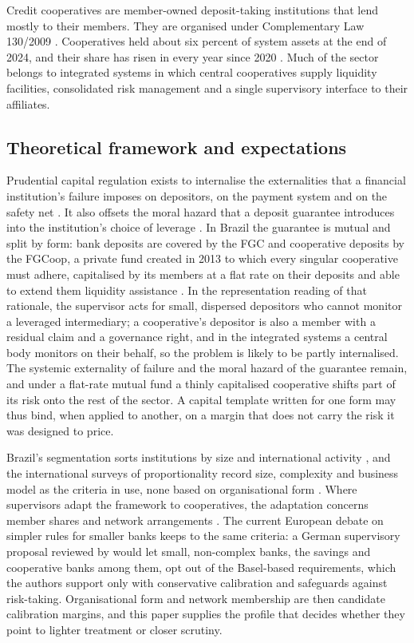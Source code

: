 \documentclass[11pt,a4paper]{article}
\begin{document}
Credit cooperatives are member-owned deposit-taking institutions that lend mostly to
their members. They are organised under Complementary Law 130/2009 \citep{lc130}.
Cooperatives held about six percent of system assets at the
end of 2024, and their share has risen in every year since
2020 \citep{bcb2025panorama}. Much of the sector belongs to integrated
systems in which central cooperatives supply liquidity facilities, consolidated risk
management and a single supervisory interface to their affiliates.

\subsection{Theoretical framework and expectations}
\label{sec:theory}

Prudential capital regulation exists to internalise the externalities that a financial
institution's failure imposes on depositors, on the payment system and on the safety
net \citep{bcbs2011}. It also offsets the moral hazard that a deposit guarantee
introduces into the institution's choice of leverage \citep{diamonddybvig1983}. In
Brazil the guarantee is mutual and split by form: bank deposits are covered by the FGC
and cooperative deposits by the FGCoop, a private fund created in 2013 to which every
singular cooperative must adhere, capitalised by its members at a flat rate on their
deposits and able to extend them liquidity assistance \citep{cmn4284, coelho2019}. In
the representation reading of that rationale, the supervisor acts for small, dispersed
depositors who cannot monitor a leveraged intermediary; a cooperative's depositor is
also a member with a residual claim and a governance right, and in the integrated
systems a central body monitors on their behalf, so the problem is likely to be partly
internalised. The systemic externality of
failure and the moral hazard of the guarantee remain, and under a flat-rate mutual fund
a thinly capitalised cooperative shifts part of its risk onto the rest of the sector. A
capital template written for one form may thus bind, when applied to another, on a
margin that does not carry the risk it was designed to price.

Brazil's segmentation sorts institutions by size and international activity
\citep{cmn4553}, and the international surveys of proportionality record size,
complexity and business model as the criteria in use, none based on organisational form
\citep{bcbs2019}. Where supervisors adapt the framework to
cooperatives, the adaptation concerns member shares and network arrangements
\citep{coelho2019}. The current European debate on simpler rules for smaller banks
keeps to the same criteria: a German supervisory proposal reviewed by \citet{berg2026}
would let small, non-complex banks, the savings and cooperative banks among them, opt
out of the Basel-based requirements, which the authors support only with conservative
calibration and safeguards against risk-taking.
Organisational form and network membership are then candidate
calibration margins, and this paper supplies the profile that decides whether they point
to lighter treatment or closer scrutiny.
\end{document}
